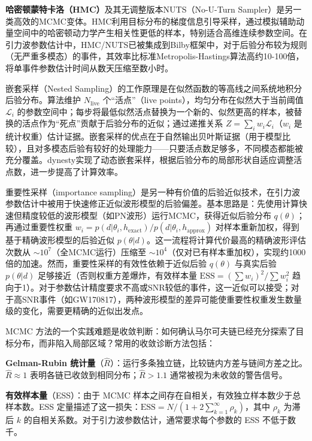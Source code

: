 \textbf{哈密顿蒙特卡洛（HMC）}及其无调整版本NUTS（No-U-Turn Sampler）是另一类高效的MCMC变体。HMC利用目标分布的梯度信息引导采样，通过模拟辅助动量空间中的哈密顿动力学产生相关性更低的样本，特别适合高维连续参数空间。在引力波参数估计中，HMC/NUTS已被集成到Bilby框架中，对于后验分布较为规则（无严重多模态）的事件，其效率比标准Metropolis-Hastings算法高约10-100倍，将单事件参数估计时间从数天压缩至数小时。

嵌套采样（Nested Sampling）的工作原理是在似然函数的等高线之间系统地积分后验分布。算法维护 $N_\mathrm{live}$ 个“活点”（live points），均匀分布在似然大于当前阈值 $\mathcal{L}_i$ 的参数空间中；每步将最低似然活点替换为一个新的、似然更高的样本，被替换的活点作为“死点”贡献于后验分布的近似；通过递推关系 $Z = \sum_i w_i \mathcal{L}_i$（$w_i$ 是统计权重）估计证据。嵌套采样的优点在于自然输出贝叶斯证据（用于模型比较），且对多模态后验有较好的处理能力——只要活点数足够多，不同模态都能被充分覆盖。dynesty实现了动态嵌套采样，根据后验分布的局部形状自适应调整活点数，进一步提高了计算效率。

重要性采样（importance sampling）是另一种有价值的后验近似技术，在引力波参数估计中被用于快速修正近似波形模型的后验偏差。基本思路是：先使用计算快速但精度较低的波形模型（如PN波形）运行MCMC，获得近似后验分布 $q(\theta)$；再通过重要性权重 $w_i = p(d|\theta_i, h_\mathrm{exact})/p(d|\theta_i, h_\mathrm{approx})$ 对样本重新加权，得到基于精确波形模型的后验近似 $p(\theta|d)$。这一流程将计算代价最高的精确波形评估次数从 $\sim 10^7$（全MCMC运行）压缩至 $\sim 10^4$（仅对已有样本重加权），实现约1000倍的加速。然而，重要性采样的有效性依赖于近似后验 $q(\theta)$ 与真实后验 $p(\theta|d)$ 足够接近（否则权重方差爆炸，有效样本量 $\mathrm{ESS} = (\sum w_i)^2/\sum w_i^2$ 趋向于1）。对于参数估计精度要求不高或SNR较低的事件，这一近似可以接受；对于高SNR事件（如GW170817），两种波形模型的差异可能使重要性权重发生数量级的变化，需要更精确的近似出发点。

MCMC 方法的一个实践难题是收敛判断：如何确认马尔可夫链已经充分探索了目标分布，而非陷入局部区域？常用的收敛诊断方法包括：

\textbf{Gelman-Rubin 统计量}（$\hat{R}$）：运行多条独立链，比较链内方差与链间方差之比。$\hat{R} \approx 1$ 表明各链已收敛到相同分布；$\hat{R} > 1.1$ 通常被视为未收敛的警告信号。

\textbf{有效样本量}（ESS）：由于 MCMC 样本之间存在自相关，有效独立样本数少于总样本数。ESS 定量描述了这一损失：$\mathrm{ESS} = N / (1 + 2\sum_{k=1}^\infty \rho_k)$，其中 $\rho_k$ 为滞后 $k$ 的自相关系数。对于引力波参数估计，通常要求每个参数的 ESS 不低于数千。

